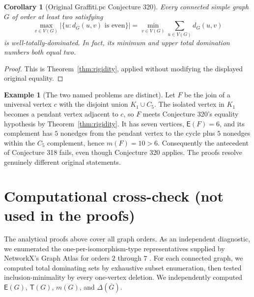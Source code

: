 \documentclass[11pt,a4paper]{article}
\newtheorem{corollary}[theorem]{Corollary}
\theoremstyle{definition}\newtheorem{definition}[theorem]{Definition}
\newtheorem{example}[theorem]{Example}
\theoremstyle{remark}\newtheorem{remark}[theorem]{Remark}
\newcommand{\Gbar}{\overline G}
\newcommand{\epar}{\mathsf E}
\newcommand{\trans}{\mathsf T}
\newcommand{\V}{V(G)}
\begin{document}
\begin{corollary}[Original Graffiti.pc Conjecture 320]\label{cor:320}
Every connected simple graph $G$ of order at least two satisfying
\[
\max_{v\in\V}|\{u:d_G(u,v)\text{ is even}\}|
=\min_{v\in\V}\sum_{u\in\V}d_G(u,v)
\]
is well-totally-dominated. In fact, its minimum and upper total domination numbers both equal two.
\end{corollary}
\begin{proof}
This is Theorem~\ref{thm:rigidity}, applied without modifying the displayed original equality.
\end{proof}

\begin{example}[The two named problems are distinct]
Let $F$ be the join of a universal vertex $c$ with the disjoint union $K_1\cup C_5$. The isolated vertex in $K_1$ becomes a pendant vertex adjacent to $c$, so $F$ meets Conjecture 320's equality hypothesis by Theorem~\ref{thm:rigidity}. It has seven vertices, $\epar(F)=6$, and its complement has $5$ nonedges from the pendant vertex to the cycle plus $5$ nonedges within the $C_5$ complement, hence $m(F)=10>6$. Consequently the antecedent of Conjecture 318 fails, even though Conjecture 320 applies. The proofs resolve genuinely different original statements.
\end{example}

\section{Computational cross-check (not used in the proofs)}
The analytical proofs above cover all graph orders. As an independent diagnostic, we enumerated the one-per-isomorphism-type representatives supplied by NetworkX's Graph Atlas for orders $2$ through $7$ \cite{NetworkX}. For each connected graph, we computed total dominating sets by exhaustive subset enumeration, then tested inclusion-minimality by every one-vertex deletion. We independently computed $\epar(G)$, $\trans(G)$, $m(G)$, and $\Delta(\Gbar)$.
\end{document}
